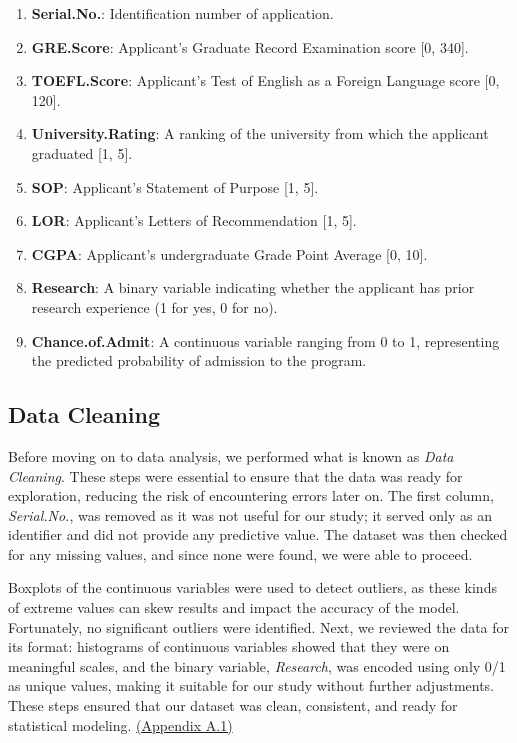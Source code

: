 \documentclass[12pt]{article}
\begin{document}
\begin{enumerate}[noitemsep]
    \item \textbf{Serial.No.}: Identification number of application.
    \item \textbf{GRE.Score}: Applicant’s Graduate Record Examination score [0, 340].
	\item \textbf{TOEFL.Score}: Applicant’s Test of English as a Foreign Language score [0, 120].
	\item \textbf{University.Rating}: A ranking of the university from which the applicant graduated [1, 5].
	\item \textbf{SOP}: Applicant’s Statement of Purpose [1, 5].
	\item \textbf{LOR}: Applicant’s Letters of Recommendation [1, 5].
	\item \textbf{CGPA}: Applicant’s undergraduate Grade Point Average [0, 10].
	\item \textbf{Research}: A binary variable indicating whether the applicant has prior research experience (1 for yes, 0 for no).
	\item \textbf{Chance.of.Admit}: A continuous variable ranging from 0 to 1, representing the predicted probability of admission to the program.
\end{enumerate}

\subsection{Data Cleaning}
Before moving on to data analysis, we performed what is known as \textit{Data Cleaning}. These steps were essential to ensure that the data was ready for exploration, reducing the risk of encountering errors later on. The first column, \textit{Serial.No.}, was removed as it was not useful for our study; it served only as an identifier and did not provide any predictive value. The dataset was then checked for any missing values, and since none were found, we were able to proceed.

\vspace{10pt}
\indent Boxplots of the continuous variables were used to detect outliers, as these kinds of extreme values can skew results and impact the accuracy of the model. Fortunately, no significant outliers were identified. Next, we reviewed the data for its format: histograms of continuous variables showed that they were on meaningful scales, and the binary variable, \textit{Research}, was encoded using only 0/1 as unique values, making it suitable for our study without further adjustments. These steps ensured that our dataset was clean, consistent, and ready for statistical modeling. \hyperref[cleaning]{\scriptsize {(Appendix A.1)}}
\end{document}
